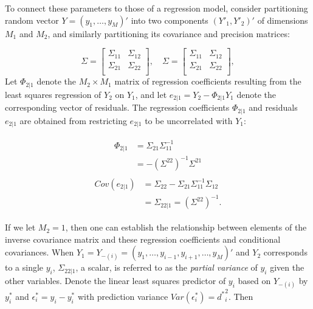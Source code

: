 To connect these parameters to those of a regression model, consider partitioning random vector $Y = \left(y_1,\dots, y_M\right)'$ into two components $\left(Y'_1,Y'_2\right)'$ of dimensions $M_1$ and $M_2$, and similarly partitioning its covariance and precision matrices:

\begin{equation} \label{eq:partitioned-covariance-matrix}
\Sigma = \begin{bmatrix} \Sigma_{11} & \Sigma_{12} \\ \Sigma_{21} & \Sigma_{22} \\  
\end{bmatrix}, \quad \Sigma = \begin{bmatrix} \Sigma_{11} & \Sigma_{12} \\ \Sigma_{21} & \Sigma_{22} \\  
\end{bmatrix},
\end{equation}
\noindent
Let $\Phi_{2\vert 1}$ denote the $M_2 \times M_1$ matrix of regression coefficients resulting from the least squares regression of $Y_2$ on $Y_1$, and let $e_{2\vert 1} = Y_2 - \Phi_{2\vert 1} Y_1$ denote the corresponding vector of residuals. The regression coefficients $\Phi_{2\vert 1}$ and residuals $e_{2\vert 1}$ are obtained from restricting $e_{2\vert 1}$ to be uncorrelated with $Y_1$:

\begin{align}
 \begin{split} \label{eq:conditional-coef-y2-given-y1}
 \Phi_{2\vert 1} &= \Sigma_{21}  \Sigma_{11}^{-1}  \\
 &= -\left( \Sigma^{22}\right)^{-1} \Sigma^{21} 
 \end{split}
 \end{align}
\begin{align}
 \begin{split} \label{eq:conditional-cov-y2-given-y1}
Cov\left(e_{2\vert 1}\right) &=  \Sigma_{22} - \Sigma_{21}\Sigma_{11}^{-1}\Sigma_{12}\\
&=  \Sigma_{22\vert 1}  = \left(\Sigma^{22} \right)^{-1}. 
 \end{split}
\end{align}

If we let $M_2 = 1$, then one can establish the relationship between elements of the inverse covariance matrix and these regression coefficients and conditional covariances. When $Y_1 = Y_{-\left(i\right)} = \left( y_1, \dots, y_{i-1}, y_{i+1},\dots, y_M \right)'$ and $Y_2$ corresponds to a single $y_i$, $\Sigma_{22\vert 1}$, a scalar, is referred to as the \textit{partial variance} of $y_i$ given the other variables.  Denote the linear least squares predictor of $y_i$ based on $Y_{-\left(i\right)}$ by $y^*_i$ and $\epsilon^*_i = y_i - y^*_i$ with prediction variance $Var\left(\epsilon^*_i \right) = {d^*}^2_i$. Then

